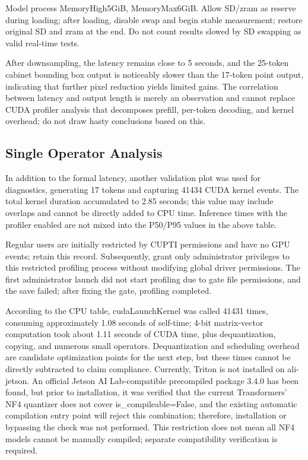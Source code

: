 Model process MemoryHigh5GiB, MemoryMax6GiB. Allow SD/zram as reserve during loading; after loading, disable swap and begin stable measurement; restore original SD and zram at the end. Do not count results slowed by SD swapping as valid real-time tests.

After downsampling, the latency remains close to 5 seconds, and the 25-token cabinet bounding box output is noticeably slower than the 17-token point output, indicating that further pixel reduction yields limited gains. The correlation between latency and output length is merely an observation and cannot replace CUDA profiler analysis that decomposes prefill, per-token decoding, and kernel overhead; do not draw hasty conclusions based on this.

\subsection{Single Operator Analysis}\label{s24-detail-3}

In addition to the formal latency, another validation plot was used for diagnostics, generating 17 tokens and capturing 41434 CUDA kernel events. The total kernel duration accumulated to 2.85 seconds; this value may include overlaps and cannot be directly added to CPU time. Inference times with the profiler enabled are not mixed into the P50/P95 values in the above table.

Regular users are initially restricted by CUPTI permissions and have no GPU events; retain this record. Subsequently, grant only administrator privileges to this restricted profiling process without modifying global driver permissions. The first administrator launch did not start profiling due to gate file permissions, and the save failed; after fixing the gate, profiling completed.

According to the CPU table, cudaLaunchKernel was called 41431 times, consuming approximately 1.08 seconds of self-time; 4-bit matrix-vector computation took about 1.11 seconds of CUDA time, plus dequantization, copying, and numerous small operators. Dequantization and scheduling overhead are candidate optimization points for the next step, but these times cannot be directly subtracted to claim compliance. Currently, Triton is not installed on ali-jetson. An official Jetson AI Lab-compatible precompiled package 3.4.0 has been found, but prior to installation, it was verified that the current Transformers' NF4 quantizer does not cover is\_compileable=False, and the existing automatic compilation entry point will reject this combination; therefore, installation or bypassing the check was not performed. This restriction does not mean all NF4 models cannot be manually compiled; separate compatibility verification is required.

